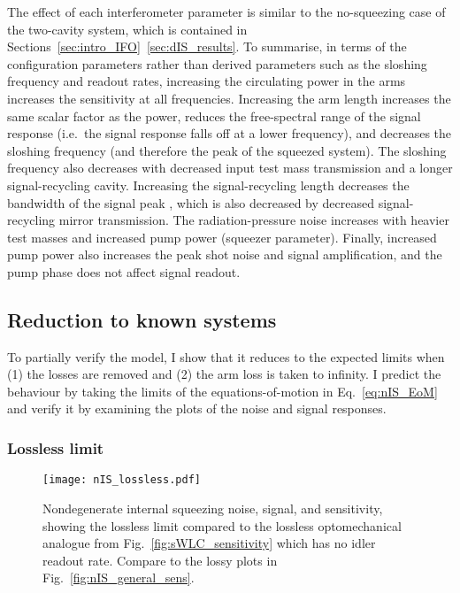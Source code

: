The effect of each interferometer parameter is similar to the no-squeezing case of the two-cavity system, which is contained in Sections~\ref{sec:intro_IFO}~\ref{sec:dIS_results}. To summarise, in terms of the configuration parameters rather than derived parameters such as the sloshing frequency and readout rates, increasing the circulating power in the arms increases the sensitivity at all frequencies. Increasing the arm length increases the same scalar factor as the power, reduces the free-spectral range of the signal response (i.e.\ the signal response falls off at a lower frequency), and decreases the sloshing frequency (and therefore the peak of the squeezed system). The sloshing frequency also decreases with decreased input test mass transmission and a longer signal-recycling cavity. Increasing the signal-recycling length decreases the bandwidth of the signal peak , which is also decreased by decreased signal-recycling mirror transmission. The radiation-pressure noise increases with heavier test masses and increased pump power (squeezer parameter). Finally, increased pump power also increases the peak shot noise and signal amplification, and the pump phase does not affect signal readout. 


\subsection{Reduction to known systems}

To partially verify the model, I show that it reduces to the expected limits when (1) the losses are removed and (2) the arm loss is taken to infinity. I predict the behaviour by taking the limits of the equations-of-motion in Eq.~\ref{eq:nIS_EoM} and verify it by examining the plots of the noise and signal responses.

\subsubsection{Lossless limit}

\begin{figure}
	\centering
	\texttt{[image: nIS\_lossless.pdf]}
	\caption{  Nondegenerate internal squeezing noise, signal, and sensitivity, showing the lossless limit compared to the lossless optomechanical analogue from Fig.~\ref{fig:sWLC_sensitivity} which has no idler readout rate. Compare to the lossy plots in Fig.~\ref{fig:nIS_general_sens}.}
	\label{fig:nIS_lossless}
\end{figure}

